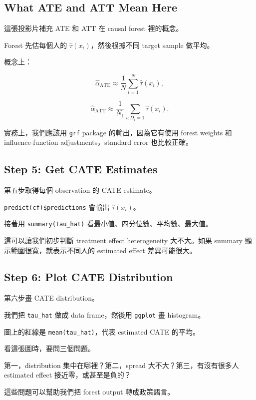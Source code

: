 \documentclass[
  chinese,
  11pt,
]{article}
\begin{document}
\subsection{What ATE and ATT Mean
Here}\label{what-ate-and-att-mean-here}

這張投影片補充 ATE 和 ATT 在 causal forest 裡的概念。

Forest 先估每個人的 \(\hat{\tau}(x_i)\)，然後根據不同 target sample
做平均。

概念上：

\[
\hat{\alpha}_{\text{ATE}}
\approx
\frac{1}{N}\sum_{i=1}^N\hat{\tau}(x_i),
\]

\[
\hat{\alpha}_{\text{ATT}}
\approx
\frac{1}{N_1}\sum_{i:D_i=1}\hat{\tau}(x_i).
\]

實務上，我們應該用 \texttt{grf} package 的輸出，因為它有使用 forest
weights 和 influence-function adjustments，standard error 也比較正確。

\subsection{Step 5: Get CATE Estimates}\label{step-5-get-cate-estimates}

第五步取得每個 observation 的 CATE estimate。

\texttt{predict(cf)\$predictions} 會輸出 \(\hat{\tau}(x_i)\)。

接著用 \texttt{summary(tau\_hat)} 看最小值、四分位數、平均數、最大值。

這可以讓我們初步判斷 treatment effect heterogeneity 大不大。如果 summary
顯示範圍很寬，就表示不同人的 estimated effect 差異可能很大。

\subsection{Step 6: Plot CATE
Distribution}\label{step-6-plot-cate-distribution}

第六步畫 CATE distribution。

我們把 \texttt{tau\_hat} 做成 data frame，然後用 \texttt{ggplot} 畫
histogram。

圖上的紅線是 \texttt{mean(tau\_hat)}，代表 estimated CATE 的平均。

看這張圖時，要問三個問題。

第一，distribution 集中在哪裡？第二，spread 大不大？第三，有沒有很多人
estimated effect 接近零，或甚至是負的？

這些問題可以幫助我們把 forest output 轉成政策語言。
\end{document}
